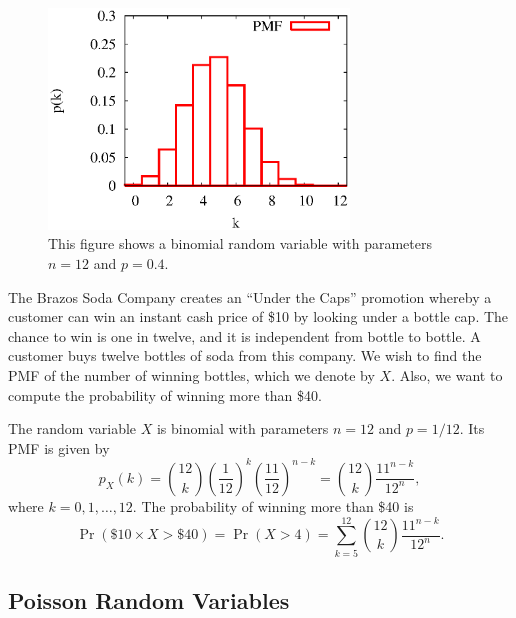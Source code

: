 \begin{figure}[ht]
\begin{center}
\includegraphics[width=8cm]{Figures/5chapter/binomial}
\end{center}
\caption{This figure shows a binomial random variable with parameters $n = 12$ and $p = 0.4$.}
\end{figure}

\begin{example} \label{BrazosSodaCompany1}
The Brazos Soda Company creates an ``Under the Caps'' promotion whereby a customer can win an instant cash price of \$10 by looking under a bottle cap.
The chance to win is one in twelve, and it is independent from bottle to bottle.
A customer buys twelve bottles of soda from this company.
We wish to find the PMF of the number of winning bottles, which we denote by $X$.
Also, we want to compute the probability of winning more than \$40.

The random variable $X$ is binomial with parameters $n = 12$ and $p = 1/12$.
Its PMF is given by
\begin{equation*}
p_X (k) = \binom{12}{k} \left( \frac{1}{12} \right)^k
\left( \frac{11}{12} \right)^{n-k}
= \binom{12}{k} \frac{11^{n-k}}{12^n} ,
\end{equation*}
where $k = 0, 1, \ldots, 12$.
The probability of winning more than \$40 is
\begin{equation*}
\Pr (\$10 \times X > \$40)
= \Pr (X > 4)
= \sum_{k=5}^{12} \binom{12}{k} \frac{11^{n-k}}{12^n} .
\end{equation*}
\end{example}


\subsection{Poisson Random Variables}

